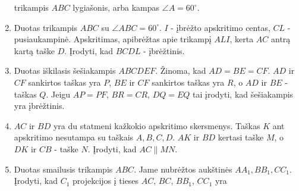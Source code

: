 \begin{enumerate}
  trikampis $ABC$ lygiašonis, arba kampas $\angle
  A=60^\circ$.
\item Duotas trikampis $ABC$ su $\angle ABC = 60^\circ$.
  $I$ - įbrėžto apskritimo centas, $CL$ - pusiaukampinė.
  Apskritimas, apibrėžtas apie trikampį $ALI$, kerta $AC$
  antrą kartą taške $D$. Įrodyti, kad $BCDL$ - įbrėžtinis.
\item Duotas iškilasis šešiakampis $ABCDEF$. Žinoma, kad $AD
  = BE = CF$. $AD$ ir $CF$ sankirtos taškas yra $P$, $BE$ ir
  $CF$ sankirtos taškas yra $R$, o $AD$ ir $BE$ - taškas
  $Q$.  Jeigu $AP = PF$, $BR = CR$, $DQ = EQ$ tai įrodyti,
  kad šešiakampis yra įbrėžtinis.
\item $AC$ ir $BD$ yra du statmeni kažkokio apskritimo
  skersmenys. Taškas $K$ ant apskritimo nesutampa su taškais
  $A, B, C, D$. $AK$ ir $BD$ kertasi taške $M$, o $DK$ ir
  $CB$ - taške $N$. Įrodyti, kad $AC\parallel{MN}$.
\item Duotas smailusis trikampis $ABC$. Jame nubrėžtos
  aukštinės $AA_1, BB_1, CC_1$. Įrodyti, kad $C_1$
  projekcijos į tieses $AC$, $BC$, $BB_1$, $CC_1$ yra

\end{enumerate}
